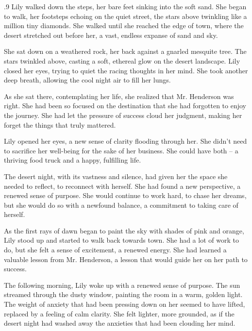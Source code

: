 \documentclass{article}
\newcommand{\Agentsroomzs}{\textsc{Agents' Room$_{ZS}$}}
\begin{document}
\begin{tcolorbox}[colback=white, colframe=gray!30!white, coltitle=black, parskip=5mm, title=
    \textbf{System output: \Agentsroomzs}, breakable]
\begin{spacing}{.9}
Lily walked down the steps, her bare feet sinking into the soft sand. She began to walk, her footsteps echoing on the quiet street, the stars above twinkling like a million tiny diamonds. She walked until she reached the edge of town, where the desert stretched out before her, a vast, endless expanse of sand and sky.\\\par

She sat down on a weathered rock, her back against a gnarled mesquite tree. The stars twinkled above, casting a soft, ethereal glow on the desert landscape. Lily closed her eyes, trying to quiet the racing thoughts in her mind. She took another deep breath, allowing the cool night air to fill her lungs.\\\par

As she sat there, contemplating her life, she realized that Mr. Henderson was right. She had been so focused on the destination that she had forgotten to enjoy the journey. She had let the pressure of success cloud her judgment, making her forget the things that truly mattered.\\\par

Lily opened her eyes, a new sense of clarity flooding through her. She didn’t need to sacrifice her well-being for the sake of her business. She could have both – a thriving food truck and a happy, fulfilling life.\\\par

The desert night, with its vastness and silence, had given her the space she needed to reflect, to reconnect with herself. She had found a new perspective, a renewed sense of purpose. She would continue to work hard, to chase her dreams, but she would do so with a newfound balance, a commitment to taking care of herself.
\\\par
As the first rays of dawn began to paint the sky with shades of pink and orange, Lily stood up and started to walk back towards town. She had a lot of work to do, but she felt a sense of excitement, a renewed energy. She had learned a valuable lesson from Mr. Henderson, a lesson that would guide her on her path to success.\\\par

The following morning, Lily woke up with a renewed sense of purpose. The sun streamed through the dusty window, painting the room in a warm, golden light. The weight of anxiety that had been pressing down on her seemed to have lifted, replaced by a feeling of calm clarity.  She felt lighter, more grounded, as if the desert night had washed away the anxieties that had been clouding her mind.\\\par


\end{spacing}
\end{tcolorbox}
\end{document}

